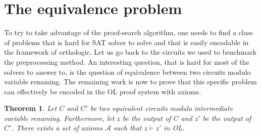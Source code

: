 \documentclass[a4paper, 11pt]{article}
\newtheorem{theorem}{Theorem}
\begin{document}
    \section{The equivalence problem}
    \label{equiv_section}
    To try to take advantage of the proof-search algorithm, one needs to find a class of problems
    that is hard for SAT solver to solve and that is easily encodable in the framework of orthologic.
    Let us go back to the circuits we used to benchmark the preprocessing method. An interesting
    question, that is hard for most of the solvers to answer to, is the question of equivalence between
    two circuits modulo variable renaming. The remaining work is now to prove that this specific problem
    can effectively be encoded in the OL proof system with axioms.
    \begin{theorem}
	    \label{th_equiv}
	    Let $C$ and $C'$ be two equivalent circuits modulo intermediate variable renaming.
	    Furthermore, let $z$ be the output of $C$ and $z'$ be the output of $C'$. There exists
	    a set of axioms $\mathcal{A}$ such that $z\vdash z'$ in OL. 
    \end{theorem}
\end{document}
